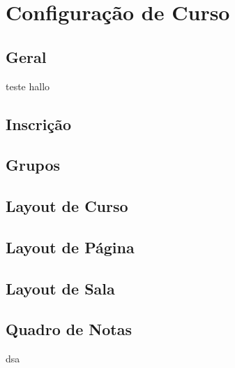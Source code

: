 \chapter{Configuração de Curso}

\section{Geral}

teste hallo

\section{Inscrição}

\section{Grupos}

\section{Layout de Curso}

\section{Layout de Página}

\section{Layout de Sala}

\section{Quadro de Notas}
dsa
